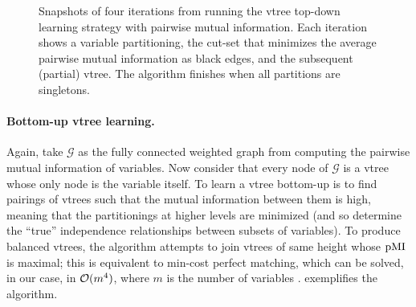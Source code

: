 \begin{figure}[t]
{
  }
  \caption{Snapshots of four iterations from running the vtree top-down learning strategy with
    pairwise mutual information. Each iteration shows a variable partitioning, the cut-set that
    minimizes the average pairwise mutual information as black edges, and the subsequent (partial)
    vtree. The algorithm finishes when all partitions are singletons.}
  \label{fig:topdownvtree}
\end{figure}

\paragraph{Bottom-up vtree learning.} Again, take $\mathcal{G}$ as the fully connected weighted
graph from computing the pairwise mutual information of variables. Now consider that every node of
$\mathcal{G}$ is a vtree whose only node is the variable itself. To learn a vtree bottom-up is to
find pairings of vtrees such that the mutual information between them is high, meaning that the
partitionings at higher levels are minimized (and so determine the ``true'' independence
relationships between subsets of variables). To produce balanced vtrees, the algorithm attempts to
join vtrees of same height whose $\operatorname{\normalfont{pMI}}$ is maximal; this is equivalent to min-cost perfect
matching, which can be solved, in our case, in $\mathcal{O}(m^4)$, where $m$ is the number of variables
\citep{edmonds65,kolmogorov09}.  exemplifies the algorithm.


